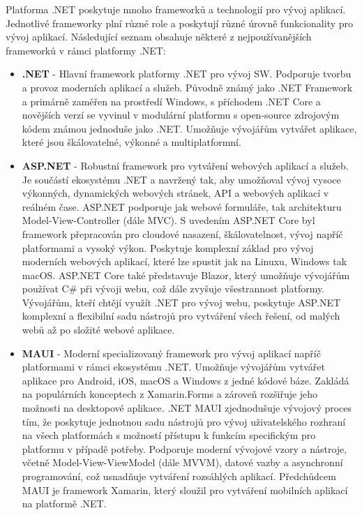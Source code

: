
Platforma .NET poskytuje mnoho frameworků a technologií pro vývoj aplikací. Jednotlivé frameworky plní různé role a poskytují různé úrovně funkcionality pro vývoj aplikací. \cite{Price2023c8} Následující seznam obsahuje některé z nejpoužívanějších frameworků v rámci platformy .NET:

\begin{itemize}
    \item \textbf{.NET} - Hlavní framework platformy .NET pro vývoj SW. Podporuje tvorbu a provoz moderních aplikací a služeb. \cite{Price2023c8} Původně známý jako .NET Framework a primárně zaměřen na prostředí Windows, s příchodem .NET Core a novějších verzí se vyvinul v modulární platformu s open-source zdrojovým kódem známou jednoduše jako .NET. Umožňuje vývojářům vytvářet aplikace, které jsou škálovatelné, výkonné a multiplatformní.
    \item \textbf{ASP.NET} - Robustní framework pro vytváření webových aplikací a služeb. Je součástí ekosystému .NET a navržený tak, aby umožňoval vývoj vysoce výkonných, dynamických webových stránek, API a webových aplikací v reálném čase. \cite{Danylko2023} ASP.NET podporuje jak webové formuláře, tak architekturu Model-View-Controller (dále MVC). S uvedením ASP.NET Core byl framework přepracován pro cloudové nasazení, škálovatelnost, vývoj napříč platformami a vysoký výkon. Poskytuje komplexní základ pro vývoj moderních webových aplikací, které lze spustit jak na Linuxu, Windows tak macOS. ASP.NET Core také představuje Blazor, který umožňuje vývojářům používat C\# při vývoji webu, což dále zvyšuje všestrannost platformy. \cite{aspnetdocs} Vývojářům, kteří chtějí využít .NET pro vývoj webu, poskytuje ASP.NET komplexní a flexibilní sadu nástrojů pro vytváření všech řešení, od malých webů až po složité webové aplikace. 
    \item \textbf{MAUI} - Moderní specializovaný framework pro vývoj aplikací napříč platformami v rámci ekosystému .NET. Umožňuje vývojářům vytvářet aplikace pro Android, iOS, macOS a Windows z jedné kódové báze. Zakládá na populárních konceptech z Xamarin.Forms a zároveň rozšiřuje jeho možnosti na desktopové aplikace. .NET MAUI zjednodušuje vývojový proces tím, že poskytuje jednotnou sadu nástrojů pro vývoj uživatelského rozhraní na všech platformách s možností přístupu k funkcím specifickým pro platformu v případě potřeby. \cite{Libery2023} Podporuje moderní vývojové vzory a nástroje, včetně Model-View-ViewModel (dále MVVM), datové vazby a asynchronní programování, což usnadňuje vytváření rozsáhlých aplikací. Předchůdcem MAUI je framework Xamarin, který sloužil pro vytváření mobilních aplikací na platformě .NET. 

\end{itemize}
